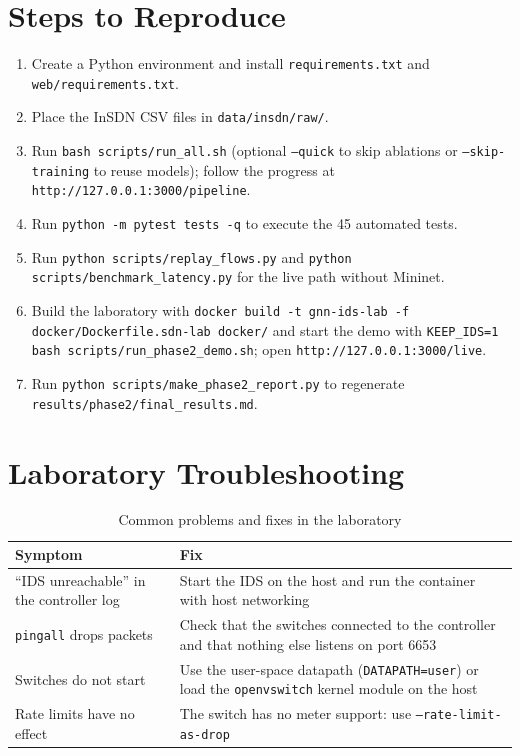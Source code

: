 \begin{appendices}
\section{Steps to Reproduce}
\begin{enumerate}
	\item Create a Python environment and install \texttt{requirements.txt} and \texttt{web/requirements.txt}.
	\item Place the InSDN CSV files in \texttt{data/insdn/raw/}.
	\item Run \texttt{bash scripts/run\_all.sh} (optional \texttt{--quick} to skip ablations or \texttt{--skip-training} to reuse models); follow the progress at \texttt{http://127.0.0.1:3000/pipeline}.
	\item Run \texttt{python -m pytest tests -q} to execute the 45 automated tests.
	\item Run \texttt{python scripts/replay\_flows.py} and \texttt{python scripts/benchmark\_latency.py} for the live path without Mininet.
	\item Build the laboratory with \texttt{docker build -t gnn-ids-lab -f docker/Dockerfile.sdn-lab docker/} and start the demo with \texttt{KEEP\_IDS=1 bash scripts/run\_phase2\_demo.sh}; open \texttt{http://127.0.0.1:3000/live}.
	\item Run \texttt{python scripts/make\_phase2\_report.py} to regenerate \texttt{results/phase2/final\_results.md}.
\end{enumerate}

\section{Laboratory Troubleshooting}
\begin{table}[htbp]
\centering
\caption{Common problems and fixes in the laboratory}
\label{tab:trouble}
\small
\begin{tabularx}{\textwidth}{|p{5.0cm}|X|}
\hline
\textbf{Symptom} & \textbf{Fix} \\ \hline
``IDS unreachable'' in the controller log & Start the IDS on the host and run the container with host networking \\ \hline
\texttt{pingall} drops packets & Check that the switches connected to the controller and that nothing else listens on port 6653 \\ \hline
Switches do not start & Use the user-space datapath (\texttt{DATAPATH=user}) or load the \texttt{openvswitch} kernel module on the host \\ \hline
Rate limits have no effect & The switch has no meter support: use \texttt{--rate-limit-as-drop} \\ \hline
\end{tabularx}
\end{table}



\end{appendices}
